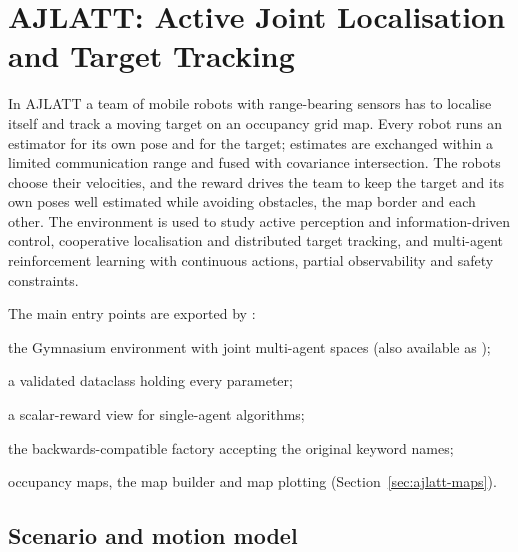 \begingroup
\setlength{\emergencystretch}{3em}
\chapter{AJLATT: Active Joint Localisation and Target Tracking}\label{chap:ajlatt}

In AJLATT a team of mobile robots with range-bearing sensors has to localise
itself and track a moving target on an occupancy grid map. Every robot runs an
estimator for its own pose and for the target; estimates are exchanged within a
limited communication range and fused with covariance intersection. The robots
choose their velocities, and the reward drives the team to keep the target and
its own poses well estimated while avoiding obstacles, the map border and each
other. The environment is used to study active perception and
information-driven control, cooperative localisation and distributed target
tracking, and multi-agent reinforcement learning with continuous actions,
partial observability and safety constraints.

The main entry points are exported by :
\begin{description}[style=nextline,leftmargin=3.9cm]
  \item[\code{AJLATTEnv}] the Gymnasium environment with joint multi-agent
    spaces (also available as );
  \item[\code{AJLATTConfig}] a validated dataclass holding every parameter;
  \item[\code{TeamRewardWrapper}] a scalar-reward view for single-agent
    algorithms;
  \item[\code{make}] the backwards-compatible factory accepting the original
    keyword names;
  \item[\code{maps}] occupancy maps, the map builder and map plotting
    (Section~\ref{sec:ajlatt-maps}).
\end{description}

\section{Scenario and motion model}\label{sec:ajlatt-scenario}

